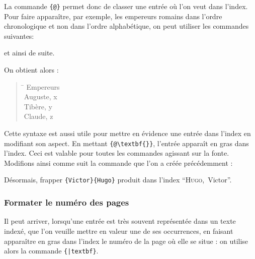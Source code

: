 La commande \verb|{|\verb|@|\verb+}+ permet donc de classer une entrée où l'on veut dans l'index. Pour faire apparaître, par exemple, les empereurs romains dans l'ordre chronologique et non dans l'ordre alphabétique, on peut utiliser les commandes suivantes:

\begin{latexcode}
et ainsi de suite. 
\end{latexcode}

On obtient alors :

\begin{quotation}
\begin{tabbing}
\hspace{0,5cm} \= \kill
Empereurs\\
\> Auguste, x\\
\> Tibère, y\\
\> Claude, z \\
\end{tabbing}
\end{quotation}

Cette syntaxe est aussi utile pour mettre en évidence une entrée dans l'index en modifiant son aspect. En mettant \verb|{|\verb|@\textbf{|\verb|}}|, l'entrée apparaît en gras dans l'index. Ceci est valable pour toutes les commandes agissant sur la fonte. Modifions ainsi comme suit la commande  que l'on a créée précédemment :

\begin{latexcode}
\newcommand\auteur[2]{#1~\textsc{#2}\index{#2 #1@\textsc{#2}, #1}\xspace}
\end{latexcode}

Désormais, frapper \verb|{Victor}{Hugo}| produit  dans l'index
 \enquote{\textsc{Hugo},~Victor}.
 
 

\subsubsection{Formater le numéro des pages}

Il peut arriver, lorsqu'une entrée est très souvent représentée dans un texte indexé, que l'on veuille mettre en valeur une de ses occurrences, en faisant apparaître en gras dans l'index le numéro de la page où elle se situe : on utilise alors la commande \verb|{|\verb+|textbf}+. 

